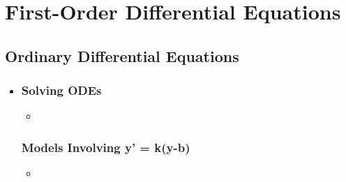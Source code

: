 
\chapter{First-Order Differential Equations}

\section{Ordinary Differential Equations}
\begin{itemize}
  \item

  \subsection{Solving ODEs}
  \begin{itemize}
    \item
  \end{itemize}

  \subsection{Models Involving y' = k(y-b)}
  \begin{itemize}
    \item
  \end{itemize}

\end{itemize}

